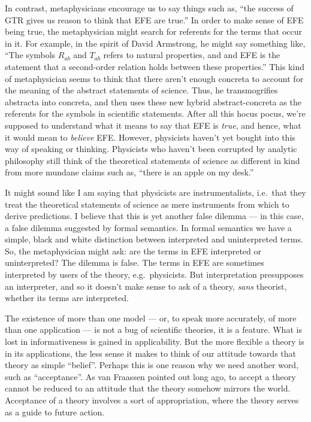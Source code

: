 In contrast, metaphysicians encourage us to say things such as, ``the
success of GTR gives us reason to think that EFE are true.''  In order
to make sense of EFE being true, the metaphysician might search for
referents for the terms that occur in it.  For example, in the spirit
of David Armstrong, he might say something like, ``The symbols
$R_{ab}$ and $T_{ab}$ refers to natural properties, and and EFE is the
statement that a second-order relation holds between these
properties.''  This kind of metaphysician seems to think that there
aren't enough concreta to account for the meaning of the abstract
statements of science.  Thus, he transmogrifies abstracta into
concreta, and then uses these new hybrid abstract-concreta as the
referents for the symbols in scientific statements.  After all this
hocus pocus, we're supposed to understand what it means to say that
EFE is {\it true}, and hence, what it would mean to {\it believe} EFE.
However, physicists haven't yet bought into this way of speaking or
thinking.  Physicists who haven't been corrupted by analytic
philosophy still think of the theoretical statements of science as
different in kind from more mundane claims such as, ``there is an
apple on my desk.''

It might sound like I am saying that physicists are instrumentalists,
i.e.\ that they treat the theoretical statements of science as mere
instruments from which to derive predictions.  I believe that this is
yet another false dilemma --- in this case, a false dilemma suggested
by formal semantics.  In formal semantics we have a simple, black and
white distinction between interpreted and uninterpreted terms.  So,
the metaphysician might ask: are the terms in EFE interpreted or
uninterpreted?  The dilemma is false.  The terms in EFE are sometimes
interpreted by users of the theory, e.g.\ physicists.  But
interpretation presupposes an interpreter, and so it doesn't make
sense to ask of a theory, {\it sans} theorist, whether its terms are
interpreted.

The existence of more than one model --- or, to speak more accurately,
of more than one application --- is not a bug of scientific theories,
it is a feature.  What is lost in informativeness is gained in
applicability.  But the more flexible a theory is in its applications,
the less sense it makes to think of our attitude towards that theory
as simple ``belief''.  Perhaps this is one reason why we need another
word, such as ``acceptance''.  As van Fraassen pointed out long ago,
to accept a theory cannot be reduced to an attitude that the theory
somehow mirrors the world.  Acceptance of a theory involves a sort of
appropriation, where the theory serves as a guide to future action.

